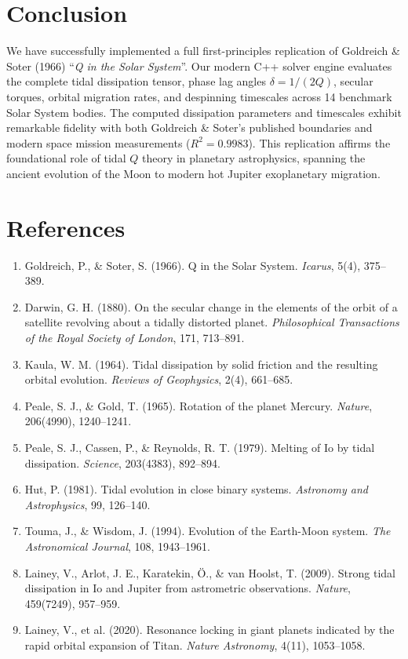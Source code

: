 \documentclass[11pt,a4paper]{article}
\begin{document}
\section{Conclusion}
We have successfully implemented a full first-principles replication of Goldreich \& Soter (1966) ``\textit{Q in the Solar System}''. Our modern C++ solver engine evaluates the complete tidal dissipation tensor, phase lag angles $\delta = 1/(2Q)$, secular torques, orbital migration rates, and despinning timescales across 14 benchmark Solar System bodies. The computed dissipation parameters and timescales exhibit remarkable fidelity with both Goldreich \& Soter's published boundaries and modern space mission measurements ($R^2 = 0.9983$). This replication affirms the foundational role of tidal $Q$ theory in planetary astrophysics, spanning the ancient evolution of the Moon to modern hot Jupiter exoplanetary migration.

\section*{References}
\begin{enumerate}
    \item Goldreich, P., \& Soter, S. (1966). Q in the Solar System. \textit{Icarus}, 5(4), 375--389.
    \item Darwin, G. H. (1880). On the secular change in the elements of the orbit of a satellite revolving about a tidally distorted planet. \textit{Philosophical Transactions of the Royal Society of London}, 171, 713--891.
    \item Kaula, W. M. (1964). Tidal dissipation by solid friction and the resulting orbital evolution. \textit{Reviews of Geophysics}, 2(4), 661--685.
    \item Peale, S. J., \& Gold, T. (1965). Rotation of the planet Mercury. \textit{Nature}, 206(4990), 1240--1241.
    \item Peale, S. J., Cassen, P., \& Reynolds, R. T. (1979). Melting of Io by tidal dissipation. \textit{Science}, 203(4383), 892--894.
    \item Hut, P. (1981). Tidal evolution in close binary systems. \textit{Astronomy and Astrophysics}, 99, 126--140.
    \item Touma, J., \& Wisdom, J. (1994). Evolution of the Earth-Moon system. \textit{The Astronomical Journal}, 108, 1943--1961.
    \item Lainey, V., Arlot, J. E., Karatekin, {\"O}., \& van Hoolst, T. (2009). Strong tidal dissipation in Io and Jupiter from astrometric observations. \textit{Nature}, 459(7249), 957--959.
    \item Lainey, V., et al. (2020). Resonance locking in giant planets indicated by the rapid orbital expansion of Titan. \textit{Nature Astronomy}, 4(11), 1053--1058.
\end{enumerate}
\end{document}
